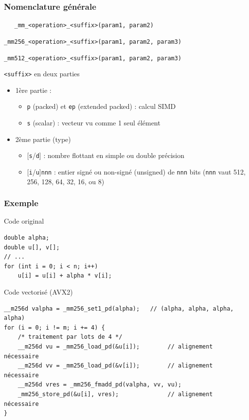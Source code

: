 \documentclass[xcolor={x11names,svgnames}]{beamer}
\begin{document}

\begin{frame}[fragile=singleslide]
  \frametitle{Nomenclature générale}

  \begin{center}
    \verb|   _mm_<operation>_<suffix>(param1, param2)        |
    
    \verb|_mm256_<operation>_<suffix>(param1, param2, param3)|

    \verb|_mm512_<operation>_<suffix>(param1, param2, param3)|
  \end{center}

  \begin{block}{\texttt{<suffix>} en deux parties}
    \begin{itemize}
    \item 1ère partie :
      \begin{itemize}
      \item \texttt{p} (packed) et \texttt{ep} (extended packed) : calcul SIMD
      \item \texttt{s} (scalar) : vecteur vu comme 1 seul élément
      \end{itemize}

    
  \item 2ème partie (type)
    \begin{itemize}
    \item{}  [\texttt{s}/\texttt{d}] : nombre flottant en simple ou double précision
    \item{} [\texttt{i}/\texttt{u}]\texttt{nnn} : entier signé ou non-signé (unsigned) de \texttt{nnn} bits (\texttt{nnn} vaut 512, 256, 128, 64, 32, 16, ou 8)
    \end{itemize}
  \end{itemize}
\end{block}
\end{frame}


\begin{frame}[fragile=singleslide]
  \frametitle{Exemple}

  \begin{block}{Code original}
\begin{verbatim}
double alpha;
double u[], v[];
// ...
for (int i = 0; i < n; i++)
    u[i] = u[i] + alpha * v[i];
\end{verbatim}
\end{block}

\begin{exampleblock}{Code vectorisé (AVX2)}
\begin{verbatim}
__m256d valpha = _mm256_set1_pd(alpha);   // (alpha, alpha, alpha, alpha)
for (i = 0; i != m; i += 4) {
    /* traitement par lots de 4 */
    __m256d vu = _mm256_load_pd(&u[i]);        // alignement nécessaire
    __m256d vv = _mm256_load_pd(&v[i]);        // alignement nécessaire
    __m256d vres = _mm256_fmadd_pd(valpha, vv, vu);
    _mm256_store_pd(&u[i], vres);              // alignement nécessaire
}
  \end{verbatim}
\end{exampleblock}
\end{frame}
\end{document}
